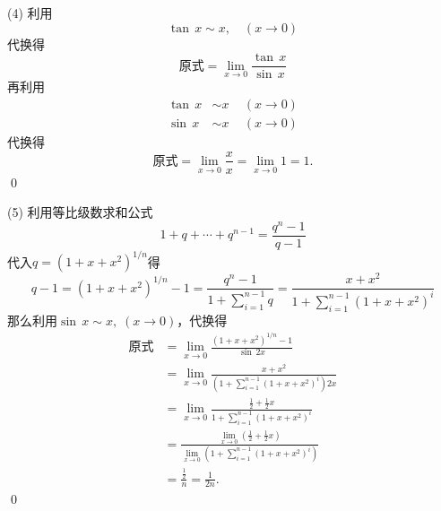 (4) \solve 利用
\begin{equation}
    \tan \, x \sim x , \quad (x \to 0)
\end{equation}
代换得
\begin{equation}
    \text{原式} = \lim_{x \to 0} \frac{\tan \, x}{\sin \, x}
\end{equation}
再利用
\begin{align}
    \tan \, x &\sim x \, \quad (x \to 0) \\
    \sin \, x &\sim x \, \quad (x \to 0)
\end{align}
代换得
\begin{equation}
    \text{原式} = \lim_{x \to 0} \frac{x}{x} = \lim_{x \to 0} 1 = 1.
\end{equation}
\qed

(5) \solve 利用等比级数求和公式
\begin{equation}
    1+q+\cdots+q^{n-1}=\frac{q^n-1}{q-1}
\end{equation}
代入$q=(1+x+x^2)^{1/n}$得
\begin{equation}
    q-1=(1+x+x^2)^{1/n}-1=\frac{q^n-1}{1+\displaystyle\sum_{i=1}^{n-1}q} = \frac{x+x^2}{1+\displaystyle\sum_{i=1}^{n-1}\left(1+x+x^2\right)^i}
\end{equation}
那么利用$\sin \, x \sim x, \; (x \to 0)$，代换得
\begin{align}
    \text{原式} &= \lim_{x \to 0} \frac{\left(1+x+x^2\right)^{1/n}-1}{\sin \, 2x} \\
    &= \lim_{x \to 0} \frac{x + x^2}{\left(1+\displaystyle\sum_{i=1}^{n-1}(1+x+x^2)^i\right)2x} \\
    &= \lim_{x \to 0} \frac{\displaystyle\frac{1}{2}+\displaystyle\frac{1}{2}x}{1+\displaystyle\sum_{i=1}^{n-1}(1+x+x^2)^i} \\
    &= \frac{\displaystyle\lim_{x \to 0}\left(\displaystyle\frac{1}{2}+\displaystyle\frac{1}{2}x\right)}{\displaystyle\lim_{x \to 0} \left( 1+\displaystyle\sum_{i=1}^{n-1}(1+x+x^2)^i \right)} \\ 
    &= \frac{\displaystyle\frac{1}{2}}{n} = \frac{1}{2n}.
\end{align}
\qed